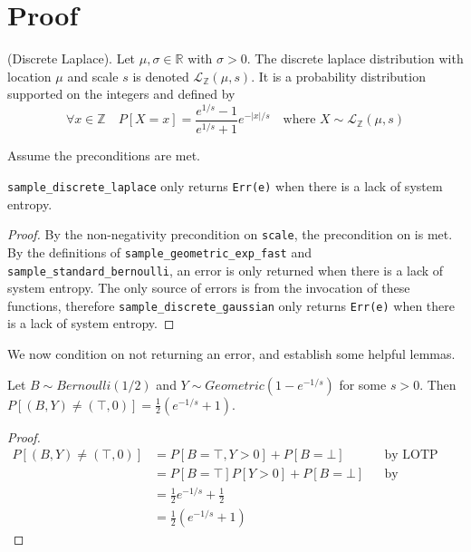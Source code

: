 \documentclass{article}
\begin{document}
\section{Proof}
\begin{definition} \cite{BV17}
    (Discrete Laplace). Let $\mu, \sigma \in \mathbb{R}$ with $\sigma > 0$. 
    The discrete laplace distribution with location $\mu$ and scale $s$ is denoted $\mathcal{L}_\mathbb{Z}(\mu, s)$. 
    It is a probability distribution supported on the integers and defined by
    \begin{equation*}
        \forall x \in \mathbb{Z} \quad  P[X = x] = \frac{e^{1/s} - 1}{e^{1/s} + 1} e^{-|x|/s} \quad \text{where } X \sim \mathcal{L}_\mathbb{Z}(\mu, s)
    \end{equation*}
\end{definition}

Assume the preconditions are met.

\begin{lemma}
    \label{err-e}
    \texttt{sample\_discrete\_laplace} only returns \texttt{Err(e)} when there is a lack of system entropy.
\end{lemma}

\begin{proof}
    By the non-negativity precondition on \texttt{scale},
    the precondition on  is met.
    By the definitions of \texttt{sample\_geometric\_exp\_fast} and \texttt{sample\_standard\_bernoulli}, 
    an error is only returned when there is a lack of system entropy.
    The only source of errors is from the invocation of these functions,
    therefore \texttt{sample\_discrete\_gaussian} only returns \texttt{Err(e)} when there is a lack of system entropy.
\end{proof}

We now condition on not returning an error, and establish some helpful lemmas.
\begin{lemma}\cite{CKS20}\label{P_B_Y_ne_T_0}
    Let $B \sim Bernoulli(1/2)$ and $Y \sim Geometric(1 - e^{-1/s})$ for some $s > 0$. 
    Then $P[(B, Y) \neq (\top, 0)] = \frac{1}{2} (e^{-1/s} + 1)$.
\end{lemma}

\begin{proof}
    \begin{align*}
        P[(B, Y) \neq (\top, 0)] &= P[B = \top, Y > 0] + P[B = \bot] && \text{by LOTP} \\
        &= P[B = \top] P[Y > 0] + P[B = \bot] && \text{by independence of B, Y} \\
        &= \frac{1}{2} e^{-1/s} + \frac{1}{2} \\
        &= \frac{1}{2} (e^{-1/s} + 1)
    \end{align*}
\end{proof}
\end{document}
